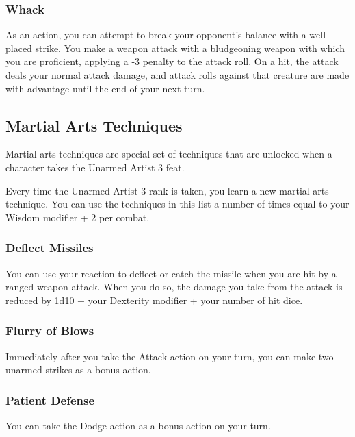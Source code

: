 \subsubsection{Whack} \label{tec::whack}
As an action, you can attempt to break your opponent's balance with a well-placed strike.
You make a weapon attack with a bludgeoning weapon with which you are proficient, applying a -3 penalty to the attack roll.
On a hit, the attack deals your normal attack damage, and attack rolls against that creature are made with advantage until the end of your next turn.

\subsection*{Martial Arts Techniques} \label{tec::martialartstechniques}
Martial arts techniques are special set of techniques that are unlocked when a character takes the Unarmed Artist 3 feat.

Every time the Unarmed Artist 3 rank is taken, you learn a new martial arts technique.
You can use the techniques in this list a number of times equal to your Wisdom modifier + 2 per combat.

\subsubsection{Deflect Missiles} \label{mtec::deflectmissiles}
You can use your reaction to deflect or catch the missile when you are hit by a ranged weapon attack.
When you do so, the damage you take from the attack is reduced by 1d10 + your Dexterity modifier + your number of hit dice.

\subsubsection{Flurry of Blows} \label{mtec::flurryofblows}
Immediately after you take the Attack action on your turn, you can make two unarmed strikes as a bonus action.

\subsubsection{Patient Defense} \label{mtec::patientdefense}
You can take the Dodge action as a bonus action on your turn.

